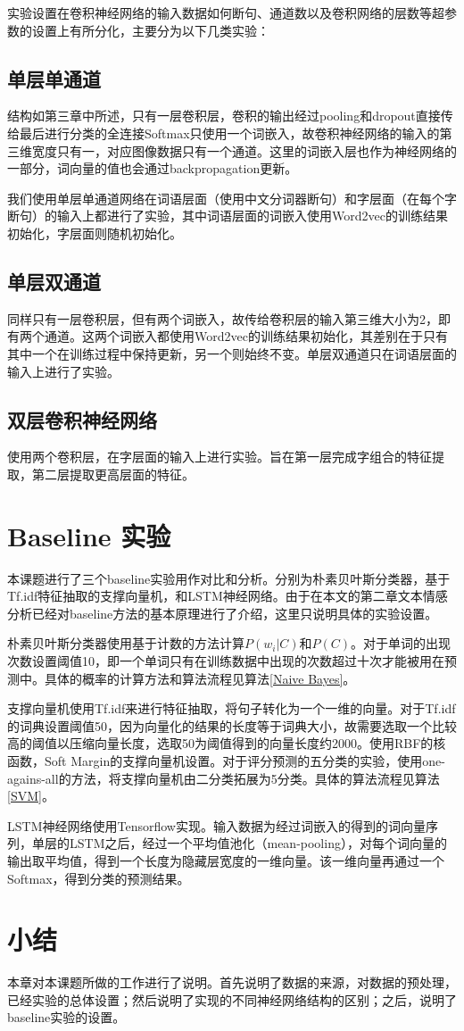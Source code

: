 实验设置在卷积神经网络的输入数据如何断句、通道数以及卷积网络的层数等超参数的设置上有所分化，主要分为以下几类实验：
\subsection{单层单通道}
结构如第三章中所述，只有一层卷积层，卷积的输出经过pooling和dropout直接传给最后进行分类的全连接Softmax只使用一个词嵌入，故卷积神经网络的输入的第三维宽度只有一，对应图像数据只有一个通道。这里的词嵌入层也作为神经网络的一部分，词向量的值也会通过backpropagation更新。

我们使用单层单通道网络在词语层面（使用中文分词器断句）和字层面（在每个字断句）的输入上都进行了实验，其中词语层面的词嵌入使用Word2vec的训练结果初始化，字层面则随机初始化。

\subsection{单层双通道}
同样只有一层卷积层，但有两个词嵌入，故传给卷积层的输入第三维大小为2，即有两个通道。这两个词嵌入都使用Word2vec的训练结果初始化，其差别在于只有其中一个在训练过程中保持更新，另一个则始终不变。单层双通道只在词语层面的输入上进行了实验。

\subsection{双层卷积神经网络}
使用两个卷积层，在字层面的输入上进行实验。旨在第一层完成字组合的特征提取，第二层提取更高层面的特征。

\section{Baseline 实验}
本课题进行了三个baseline实验用作对比和分析。分别为朴素贝叶斯分类器，基于Tf.idf特征抽取的支撑向量机，和LSTM神经网络。由于在本文的第二章文本情感分析已经对baseline方法的基本原理进行了介绍，这里只说明具体的实验设置。

朴素贝叶斯分类器使用基于计数的方法计算$P(w_i|C)$和$P(C)$。对于单词的出现次数设置阈值10，即一个单词只有在训练数据中出现的次数超过十次才能被用在预测中。具体的概率的计算方法和算法流程见算法\ref{Naive Bayes}。

支撑向量机使用Tf.idf来进行特征抽取，将句子转化为一个一维的向量。对于Tf.idf的词典设置阈值50，因为向量化的结果的长度等于词典大小，故需要选取一个比较高的阈值以压缩向量长度，选取50为阈值得到的向量长度约2000。使用RBF的核函数，Soft Margin的支撑向量机设置。对于评分预测的五分类的实验，使用one-agains-all的方法，将支撑向量机由二分类拓展为5分类。具体的算法流程见算法\ref{SVM}。

LSTM神经网络使用Tensorflow实现。输入数据为经过词嵌入的得到的词向量序列，单层的LSTM之后，经过一个平均值池化（mean-pooling），对每个词向量的输出取平均值，得到一个长度为隐藏层宽度的一维向量。该一维向量再通过一个Softmax，得到分类的预测结果。

\section{小结}
本章对本课题所做的工作进行了说明。首先说明了数据的来源，对数据的预处理，已经实验的总体设置；然后说明了实现的不同神经网络结构的区别；之后，说明了baseline实验的设置。
